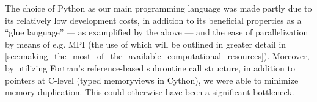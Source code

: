 The choice of Python as our main programming language was made partly due to
its relatively low development costs, in addition to its beneficial properties
as a ``glue language'' --- as examplified by the above --- and the ease of
parallelization by means of e.g. MPI (the use of which will be outlined in
greater detail in
\cref{sec:making_the_most_of_the_available_computational_resources}).
Moreover, by utilizing Fortran's reference-based subroutine call structure, in
addition to pointers at C-level (typed memoryviews in Cython), we were able to
minimize memory duplication. This could otherwise have been a significant
bottleneck.

